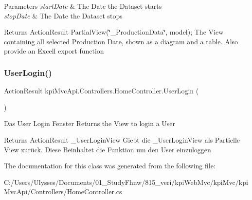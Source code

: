 \begin{DoxyParams}{Parameters}
{\em start\+Date} & The Date the Dataset starts\\
\hline
{\em stop\+Date} & The Date the Dataset stops \\
\hline
\end{DoxyParams}
\begin{DoxyReturn}{Returns}
{\ttfamily Action\+Result Partial\+View(\char`\"{}\+\_\+\+Production\+Data\char`\"{}, model);} The View containing all selected Production Date, shown as a diagram and a table. Also provide an Excell export function 
\end{DoxyReturn}
\mbox{\label{classkpi_mvc_api_1_1_controllers_1_1_home_controller_a52ba84d65a16f3ec9f7c18ef46313b23}} 
\subsubsection{\texorpdfstring{User\+Login()}{UserLogin()}}
{\footnotesize\ttfamily Action\+Result kpi\+Mvc\+Api.\+Controllers.\+Home\+Controller.\+User\+Login (\begin{DoxyParamCaption}{ }\end{DoxyParamCaption})\hspace{0.3cm}{\ttfamily [inline]}}



Das User Login Fenster Returns the View to login a User 

\begin{DoxyReturn}{Returns}
{\ttfamily Action\+Result \+\_\+\+User\+Login\+View} Giebt die \+\_\+\+User\+Login\+View als Partielle View zurück. Diese Beinhaltet die Funktion um den User einzuloggen 
\end{DoxyReturn}


The documentation for this class was generated from the following file\+:\begin{DoxyCompactItemize}
\item 
C\+:/\+Users/\+Ulysses/\+Documents/01\+\_\+\+Study\+Fhnw/815\+\_\+veri/kpi\+Web\+Mvc/kpi\+Mvc/kpi\+Mvc\+Api/\+Controllers/Home\+Controller.\+cs\end{DoxyCompactItemize}
